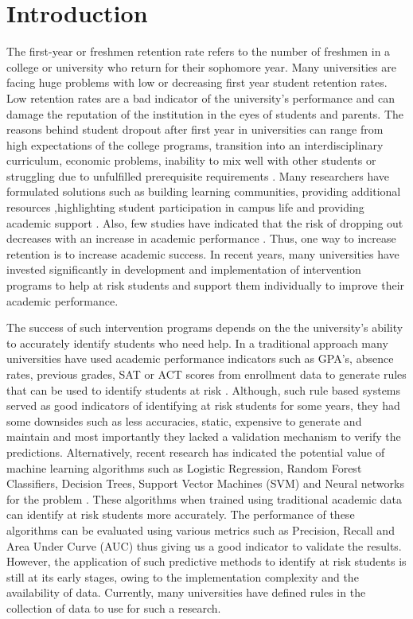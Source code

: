 \documentclass[11pt,openright]{report}
\begin{document}
\chapter{Introduction}\label{chapter:introduction} 

The first-year or freshmen retention rate refers to the number of freshmen in a college or university who return for their sophomore year. Many universities are facing huge problems with low or decreasing first year student retention rates. Low retention rates are a bad indicator of the university's performance and can damage the reputation of the institution in the eyes of students and parents. The reasons behind student dropout after first year in universities can range from high expectations of the college programs, transition into an interdisciplinary curriculum, economic problems, inability to mix well with other students or struggling due to unfulfilled prerequisite requirements \cite{lau2003institutional}. Many researchers have formulated solutions such as building learning communities, providing additional resources \cite{tinto1999taking},highlighting student participation in campus life and providing academic support \cite{lau2003institutional}. Also, few studies have indicated that the risk of dropping out decreases with an increase in academic performance \cite{Murtaugh}. Thus, one way to increase retention is to increase academic success. In recent years, many universities have invested significantly in development and implementation of intervention programs to help at risk students and support them individually to improve their academic performance. 

The success of such intervention programs depends on the the university's ability to accurately identify students who need help. In a traditional approach many universities have used academic performance indicators such as GPA's, absence rates, previous grades, SAT or ACT scores from enrollment data to generate rules that can be used to identify students at risk \cite{bingham2016}. Although, such rule based systems served as good indicators of identifying at risk students for some years, they had some downsides such as less accuracies, static,  expensive to generate and maintain and most importantly they lacked a validation mechanism to verify the predictions. Alternatively, recent research has indicated the potential value of machine learning algorithms such as Logistic Regression, Random Forest Classifiers, Decision Trees, Support Vector Machines (SVM) and Neural networks for the problem \cite{plagge2013using,lakkaraju2015machine,marbouti2016models}. These algorithms when trained using traditional academic data can identify at risk students more accurately. The performance of these algorithms can be evaluated using various metrics such as Precision, Recall and Area Under Curve (AUC) thus giving us a good indicator to validate the results. However, the application of such predictive methods to identify at risk students is still at its early stages, owing to the implementation complexity and the availability of data. Currently, many universities have defined rules in the collection of data to use for such a research.
\end{document}
